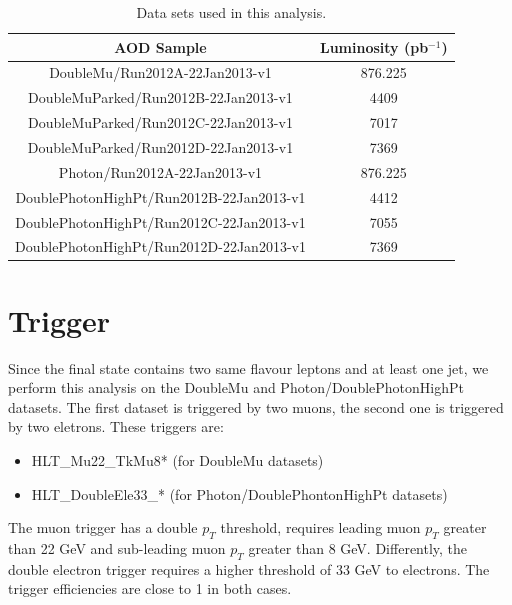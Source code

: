 \begin{center}
  \begin{table}[h]
    \begin{center}
      \begin{tabular}{|c|c|}
        \hline
        AOD Sample & Luminosity (pb$^{-1}$) \\ \hline
        DoubleMu/Run2012A-22Jan2013-v1 & 876.225 \\ \hline
        DoubleMuParked/Run2012B-22Jan2013-v1 & 4409 \\ \hline
        DoubleMuParked/Run2012C-22Jan2013-v1 & 7017 \\ \hline
        DoubleMuParked/Run2012D-22Jan2013-v1 & 7369 \\ \hline
        Photon/Run2012A-22Jan2013-v1 &  876.225 \\ \hline
        DoublePhotonHighPt/Run2012B-22Jan2013-v1 & 4412 \\ \hline
        DoublePhotonHighPt/Run2012C-22Jan2013-v1 & 7055 \\ \hline
        DoublePhotonHighPt/Run2012D-22Jan2013-v1 & 7369 \\
        \hline
      \end{tabular}
    \end{center}
    \caption{\label{tab:TabDataSet}Data sets used in this analysis.}    
  \end{table}
\end{center}

\section{Trigger}
Since the final state contains two same flavour leptons and at least one jet, we perform this analysis on the DoubleMu and Photon/DoublePhotonHighPt datasets. The first dataset is triggered by two muons, the second one is triggered by two eletrons. These triggers are:
\begin{itemize}
\item HLT\_Mu22\_TkMu8* (for DoubleMu datasets)
\item HLT\_DoubleEle33\_* (for Photon/DoublePhontonHighPt datasets)
\end{itemize}

The muon trigger has a double $p_{T}$ threshold, requires leading muon $p_{T}$ greater than 22 GeV and sub-leading muon $p_{T}$ greater than 8 GeV. Differently, the double electron trigger requires a higher threshold of 33 GeV to electrons. The trigger efficiencies are close to 1 in both cases.

